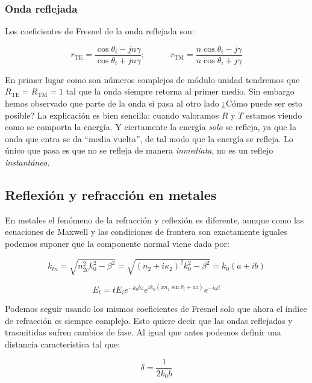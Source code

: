 \documentclass[12pt]{article}
\newcommand{\tquad}{\quad \quad \quad}
\newcommand{\TE}{\mathrm{TE}}
\newcommand{\TM}{\mathrm{TM}}
\numberwithin{equation}{section}
\numberwithin{figure}{section}
\begin{document}
\subsubsection{Onda reflejada}

Los coeficientes de Fresnel de la onda reflejada son:

\begin{equation}
r_{\TE} = \dfrac{\cos \theta_i - j n \gamma}{\cos \theta_i + j n \gamma}; \tquad r_{\TM} = \dfrac{n \cos \theta_i - j \gamma}{n \cos \theta_i + j \gamma}
\end{equation}

En primer lugar como son números complejos de módulo unidad tendremos que $R_{\TE} = R_{\TM}=1$ tal que la onda siempre retorna al primer medio. Sin embargo hemos observado que parte de la onda si pasa al otro lado ¿Cómo puede ser esto posible? La explicación es bien sencilla: cuando valoramos $R$ y $T$ estamos viendo como se comporta la energía. Y ciertamente la energía \textit{solo} se refleja, ya que la onda que entra se da ``media vuelta'', de tal modo que la energía se refleja. Lo único que pasa es que no se refleja de manera \textit{inmediata}, no es un reflejo \textit{instantáneo.}


\subsection{Reflexión y refracción en metales}

En metales el fenómeno de la refracción y reflexión es diferente, aunque como  las ecuaciones de Maxwell y las condiciones de frontera son exactamente iguales podemos suponer que la componente normal viene dada por:

\begin{equation}
k_{tn} = \sqrt{n_{2c}^2 k_0^2 - \beta^2} = \sqrt{(n_2 + i \kappa_2)^2 k_0^2 - \beta^2} = k_0 (a + ib)
\end{equation}

\begin{equation}
E_t = t E_i e^{-k_0 b z} e^{i k_0 (x n_1 \sin \theta_i + a z )} e^{- i \omega t}
\end{equation}

Podemos seguir usando los mismos coeficientes de Fresnel solo que ahora el índice de refracción es siempre complejo. Esto quiere decir que las ondas reflejadas y trasmitidas sufren cambios de fase. Al igual que antes podemos definir una distancia característica tal que:

\begin{equation}
\delta = \dfrac{1}{2 k_0 b}
\end{equation}
\end{document}
